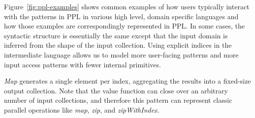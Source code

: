 

Figure~\ref{fig:ppl-examples} shows common examples of how users typically interact with
the patterns in PPL in various high level, domain specific languages
and how those examples are correspondingly represented in PPL. In some cases, the syntactic structure is
essentially the same except that the input domain is inferred from the shape of
the input collection. Using explicit indices in the intermediate language allows
us to model more user-facing patterns and more input access patterns with fewer internal primitives.






\emph{Map} generates a single element per index, aggregating the results into a fixed-size output collection.
Note that the value function can close over an arbitrary number of input collections, and therefore this pattern can represent classic parallel operations like \emph{map}, \emph{zip},
and \emph{zipWithIndex}.

